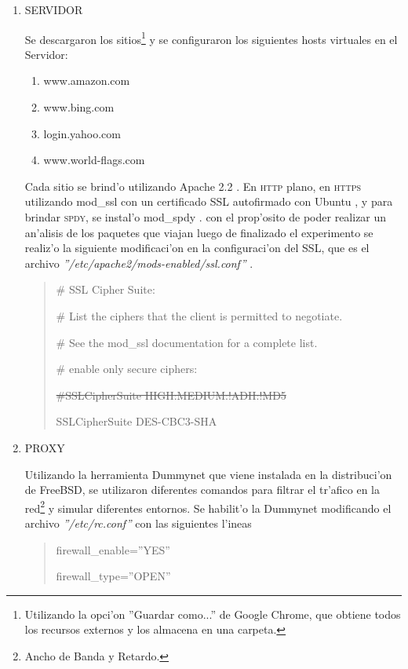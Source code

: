 \documentclass[a4paper,11pt,twocolumn]{article}
\begin{document}
\begin{enumerate}
\item SERVIDOR

Se descargaron los sitios\footnote{Utilizando la opci'on ''Guardar como...'' de Google Chrome, que obtiene todos los recursos externos y los almacena en una carpeta.} y se configuraron los siguientes hosts virtuales en el Servidor:
\begin{enumerate}
\item www.amazon.com
\item www.bing.com
\item login.yahoo.com
\item www.world-flags.com \cite{flags}
\end{enumerate}

Cada sitio se brind'o utilizando Apache 2.2 \cite{apache}. En \textsc{http} plano, en \textsc{https} utilizando mod\_ssl \cite{modSSL} con un certificado SSL autofirmado con Ubuntu \cite[Secci'on 4]{spdyGT}, y para brindar \textsc{spdy}, se instal'o mod\_spdy \cite{modSPDY}. con el prop'osito de poder realizar un an'alisis de los paquetes que viajan luego de finalizado el experimento se realiz'o la siguiente modificaci'on en la configuraci'on del SSL, que es el archivo \emph{''/etc/apache2/mods-enabled/ssl.conf''} \cite{siffSSL}.

\begin{quote}\small
\#   SSL Cipher Suite:

\#   List the ciphers that the client is permitted to negotiate.

\#   See the mod\_ssl documentation for a complete list.

\#   enable only secure ciphers:

\sout{\#SSLCipherSuite HIGH:MEDIUM:!ADH:!MD5}

SSLCipherSuite DES-CBC3-SHA
\end{quote}

\item PROXY

Utilizando la herramienta Dummynet \cite{dummynet} que viene instalada en la distribuci'on de FreeBSD, se utilizaron diferentes comandos \cite{ipfw} para filtrar el tr'afico en la red\footnote{Ancho de Banda y Retardo.} y simular diferentes entornos. Se habilit'o la Dummynet modificando el archivo \emph{''/etc/rc.conf''} con las siguientes l'ineas

\begin{quote}\small
firewall\_enable=''YES''

firewall\_type=''OPEN''


\end{quote}
\end{enumerate}
\end{document}
